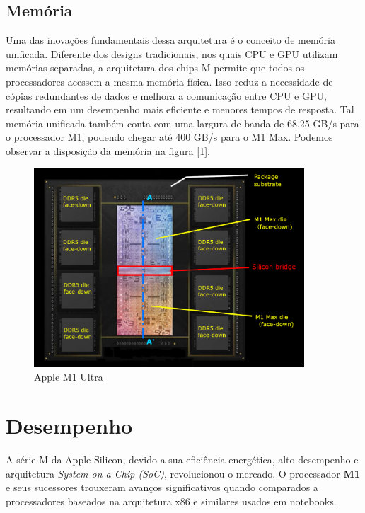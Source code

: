 \documentclass[a4paper,times,12pt]{article}
\begin{document}
\subsection{Memória}
\hspace{+15pt}
Uma das inovações fundamentais dessa arquitetura é o conceito de memória unificada. Diferente dos designs tradicionais, nos quais CPU e GPU utilizam memórias separadas, a arquitetura dos chips M permite que todos os processadores acessem a mesma memória física. Isso reduz a necessidade de cópias redundantes de dados e melhora a comunicação entre CPU e GPU, resultando em um desempenho mais eficiente e menores tempos de resposta. Tal memória unificada também conta com uma largura de banda de 68.25 GB/s para o processador M1, podendo chegar até 400 GB/s para o M1 Max. Podemos observar a disposição da memória na figura [\ref{fig:apple_m1_ultra}].

\begin{figure}[ht]
    \centering
    \includegraphics[width=0.9\textwidth]{./apple-m1-ultra.png}
    \caption{Apple M1 Ultra}
    \label{fig:apple_m1_ultra}
\end{figure}

\newpage
\section{Desempenho}
\hspace{+15pt}
A série M da Apple Silicon, devido a sua eficiência energética, alto desempenho e arquitetura \textit{System on a Chip (SoC)}, revolucionou o mercado. O processador \textbf{M1} e seus sucessores trouxeram avanços significativos quando comparados a processadores baseados na arquitetura x86 e similares usados em notebooks.
\end{document}
